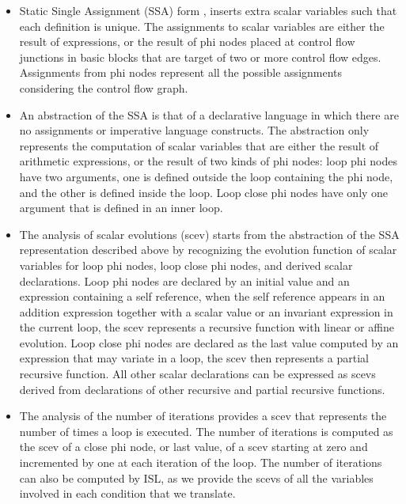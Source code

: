 \documentclass{sigplanconf}
\begin{document}
\begin{itemize}
\item Static Single Assignment (SSA) form \cite{cytron}, inserts extra scalar
  variables such that each definition is unique.  The assignments to scalar
  variables are either the result of expressions, or the result of phi nodes
  placed at control flow junctions in basic blocks that are target of two or
  more control flow edges.  Assignments from phi nodes represent all the
  possible assignments considering the control flow graph.

\item An abstraction of the SSA is that of a declarative language
  \cite{spop2007} in which there are no assignments or imperative language
  constructs.  The abstraction only represents the computation of scalar
  variables that are either the result of arithmetic expressions, or the result
  of two kinds of phi nodes: loop phi nodes have two arguments, one is defined
  outside the loop containing the phi node, and the other is defined inside the
  loop.  Loop close phi nodes have only one argument that is defined in an inner
  loop.

\item The analysis of scalar evolutions (scev) \cite{scev} starts from the
  abstraction of the SSA representation described above by recognizing the
  evolution function of scalar variables for loop phi nodes, loop close phi
  nodes, and derived scalar declarations.  Loop phi nodes are declared by an
  initial value and an expression containing a self reference, when the self
  reference appears in an addition expression together with a scalar value or an
  invariant expression in the current loop, the scev represents a recursive
  function with linear or affine evolution.  Loop close phi nodes are declared
  as the last value computed by an expression that may variate in a loop, the
  scev then represents a partial recursive function.  All other scalar
  declarations can be expressed as scevs derived from declarations of other
  recursive and partial recursive functions.

\item The analysis of the number of iterations \cite{scev} provides a scev that
  represents the number of times a loop is executed.  The number of iterations
  is computed as the scev of a close phi node, or last value, of a scev starting
  at zero and incremented by one at each iteration of the loop.  The number of
  iterations can also be computed by ISL, as we provide the scevs of all the
  variables involved in each condition that we translate.


\end{itemize}
\end{document}
